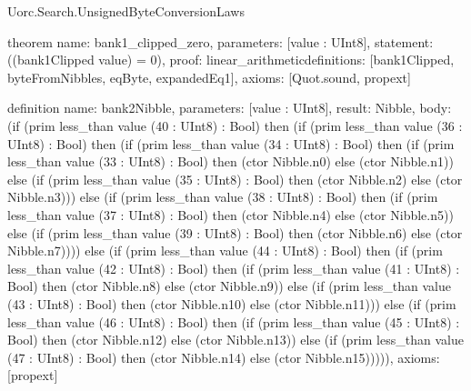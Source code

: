 \begin{lexlean}{Uorc.Search.UnsignedByteConversionLaws}
\begin{semanticmodule}
theorem{
  name: bank1_clipped_zero,
  parameters: [value : UInt8],
  statement: ((bank1Clipped value) = 0),
  proof: linear_arithmetic{definitions: [bank1Clipped, byteFromNibbles, eqByte, expandedEq1]},
  axioms: [Quot.sound, propext]
}

definition{
  name: bank2Nibble,
  parameters: [value : UInt8],
  result: Nibble,
  body: (if (prim less_than value (40 : UInt8) : Bool) then (if (prim less_than value (36 : UInt8) : Bool) then (if (prim less_than value (34 : UInt8) : Bool) then (if (prim less_than value (33 : UInt8) : Bool) then (ctor Nibble.n0) else (ctor Nibble.n1)) else (if (prim less_than value (35 : UInt8) : Bool) then (ctor Nibble.n2) else (ctor Nibble.n3))) else (if (prim less_than value (38 : UInt8) : Bool) then (if (prim less_than value (37 : UInt8) : Bool) then (ctor Nibble.n4) else (ctor Nibble.n5)) else (if (prim less_than value (39 : UInt8) : Bool) then (ctor Nibble.n6) else (ctor Nibble.n7)))) else (if (prim less_than value (44 : UInt8) : Bool) then (if (prim less_than value (42 : UInt8) : Bool) then (if (prim less_than value (41 : UInt8) : Bool) then (ctor Nibble.n8) else (ctor Nibble.n9)) else (if (prim less_than value (43 : UInt8) : Bool) then (ctor Nibble.n10) else (ctor Nibble.n11))) else (if (prim less_than value (46 : UInt8) : Bool) then (if (prim less_than value (45 : UInt8) : Bool) then (ctor Nibble.n12) else (ctor Nibble.n13)) else (if (prim less_than value (47 : UInt8) : Bool) then (ctor Nibble.n14) else (ctor Nibble.n15))))),
  axioms: [propext]
}


\end{semanticmodule}
\end{lexlean}
